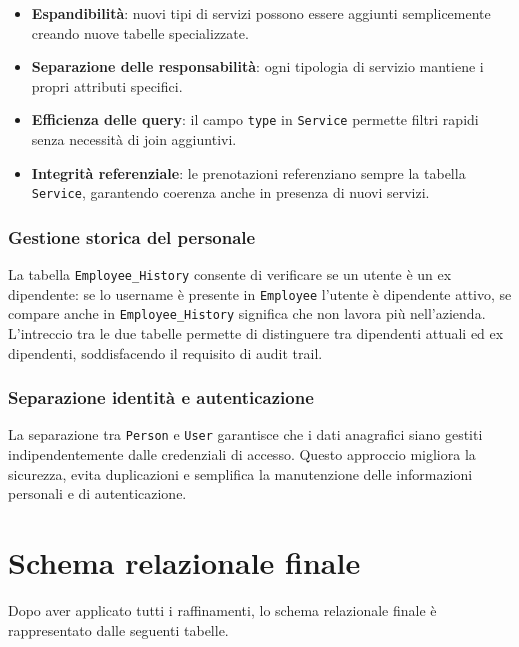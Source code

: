 \documentclass[a4paper,12pt]{report}
\begin{document}
\begin{itemize}
  \item \textbf{Espandibilità}: nuovi tipi di servizi possono essere
    aggiunti semplicemente creando nuove tabelle specializzate.
  \item \textbf{Separazione delle responsabilità}: ogni tipologia di
    servizio mantiene i propri attributi specifici.
  \item \textbf{Efficienza delle query}: il campo \texttt{type} in
    \texttt{Service} permette filtri rapidi senza necessità di join aggiuntivi.
  \item \textbf{Integrità referenziale}: le prenotazioni referenziano
    sempre la tabella \texttt{Service}, garantendo coerenza anche in
    presenza di nuovi servizi.
\end{itemize}

\subsubsection{Gestione storica del personale}
La tabella \texttt{Employee\_History} consente di verificare se un
utente è un ex dipendente: se lo username è presente in
\texttt{Employee} l'utente è dipendente attivo, se compare anche in
\texttt{Employee\_History} significa che non lavora più nell'azienda.
L'intreccio tra le due tabelle permette di distinguere tra dipendenti
attuali ed ex dipendenti, soddisfacendo il requisito di audit trail.

\subsubsection{Separazione identità e autenticazione}
La separazione tra \texttt{Person} e \texttt{User} garantisce che i
dati anagrafici siano gestiti indipendentemente dalle credenziali di
accesso. Questo approccio migliora la sicurezza, evita duplicazioni e
semplifica la manutenzione delle informazioni personali e di autenticazione.

\section{Schema relazionale finale}
Dopo aver applicato tutti i raffinamenti, lo schema relazionale
finale è rappresentato dalle seguenti tabelle.
\end{document}
